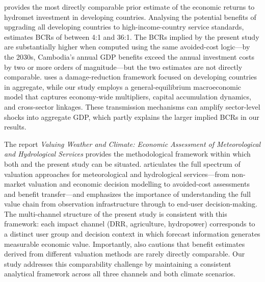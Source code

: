 \documentclass[
  final,
  10pt,
  letterpaper,
  english,
]{article}
\begin{document}
\textcite{hallegatte_cost_2012} provides the most directly comparable prior
estimate of the economic returns to hydromet investment in developing countries.
Analysing the potential benefits of upgrading all developing countries to
high-income-country service standards, \textcite{hallegatte_cost_2012} estimates
BCRs of between 4:1 and 36:1. The BCRs implied by the present study are
substantially higher when computed using the same avoided-cost logic---by the
2030s, Cambodia's annual GDP benefits exceed the annual investment costs by two
or more orders of magnitude---but the two estimates are not directly comparable.
\textcite{hallegatte_cost_2012} uses a damage-reduction framework focused on
developing countries in aggregate, while our study employs a general-equilibrium
macroeconomic model that captures economy-wide multipliers, capital accumulation
dynamics, and cross-sector linkages. These transmission mechanisms can amplify
sector-level shocks into aggregate GDP, which partly explains the larger implied
BCRs in our results.

The \textcite{world2015valuing} report \textit{Valuing Weather and Climate:
Economic Assessment of Meteorological and Hydrological Services} provides the
methodological framework within which both \textcite{hallegatte_cost_2012} and
the present study can be situated. \textcite{world2015valuing} articulates the
full spectrum of valuation approaches for meteorological and hydrological
services---from non-market valuation and economic decision modelling to
avoided-cost assessments and benefit transfer---and emphasizes the importance of
understanding the full value chain from observation infrastructure through to
end-user decision-making. The multi-channel structure of the present study is
consistent with this framework: each impact channel (DRR, agriculture,
hydropower) corresponds to a distinct user group and decision context in which
forecast information generates measurable economic value. Importantly,
\textcite{world2015valuing} also cautions that benefit estimates derived from
different valuation methods are rarely directly comparable. Our study addresses
this comparability challenge by maintaining a consistent analytical framework
across all three channels and both climate scenarios. 
\end{document}

